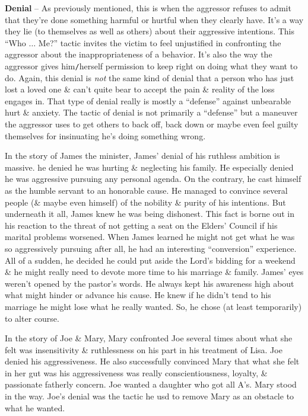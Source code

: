 \documentclass{article}
\numberwithin{equation}{section}
\begin{document}
\textbf{Denial} -- As previously mentioned, this is when the aggressor refuses to admit that they're done something harmful or hurtful when they clearly have. It's a way they lie (to themselves as well as others) about their aggressive intentions. This ``Who $\ldots$ Me?'' tactic invites the victim to feel unjustified in confronting the aggressor about the inappropriateness of a behavior. It's also the way the aggressor gives him\texttt{/}herself permission to keep right on doing what they want to do. Again, this denial is \textit{not} the same kind of denial that a person who has just lost a loved one \& can't quite bear to accept the pain \& reality of the loss engages in. That type of denial really is mostly a ``defense'' against unbearable hurt \& anxiety. The tactic of denial is not primarily a ``defense'' but a maneuver the aggressor uses to get others to back off, back down or maybe even feel guilty themselves for insinuating he's doing something wrong.

In the story of James the minister, James' denial of his ruthless ambition is massive. he denied he was hurting \& neglecting his family. He especially denied he was aggressive pursuing any personal agenda. On the contrary, he cast himself as the humble servant to an honorable cause. He managed to convince several people (\& maybe even himself) of the nobility \& purity of his intentions. But underneath it all, James knew he was being dishonest. This fact is borne out in his reaction to the threat of not getting a seat on the Elders' Council if his marital problems worsened. When James learned he might not get what he was so aggressively pursuing after all, he had an interesting ``conversion'' experience. All of a sudden, he decided he could put aside the Lord's bidding for a weekend \& he might really need to devote more time to his marriage \& family. James' eyes weren't opened by the pastor's words. He always kept his awareness high about what might hinder or advance his cause. He knew if he didn't tend to his marriage he might lose what he really wanted. So, he chose (at least temporarily) to alter course.

In the story of Joe \& Mary, Mary confronted Joe several times about what she felt was insensitivity \& ruthlessness on his part in his treatment of Lisa. Joe denied his aggressiveness. He also successfully convinced Mary that what she felt in her gut was his aggressiveness was really conscientiousness, loyalty, \& passionate fatherly concern. Joe wanted a daughter who got all A's. Mary stood in the way. Joe's denial was the tactic he usd to remove Mary as an obstacle to what he wanted.
\end{document}
